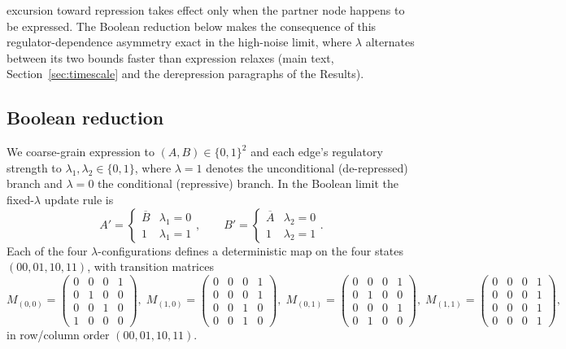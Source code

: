 \documentclass[11pt]{article}
\providecommand{\DIFaddtex}[1]{{\protect\color{red}#1}} %
\providecommand{\DIFdeltex}[1]{} %
\providecommand{\DIFaddbegin}{} %
\providecommand{\DIFaddend}{} %
\providecommand{\DIFdelbegin}{} %
\providecommand{\DIFdelend}{} %
\providecommand{\DIFadd}[1]{\texorpdfstring{\DIFaddtex{#1}}{#1}} %
\providecommand{\DIFdel}[1]{\texorpdfstring{\DIFdeltex{#1}}{}} %
\providecommand{\DIFaddincludegraphics}[2][]{\DIFOincludegraphics[#1]{#2}} %
\providecommand{\DIFdelincludegraphics}[2][]{}
\DeclareRobustCommand{\DIFaddbegin}{\DIFOaddbegin \let\includegraphics\DIFaddincludegraphics} %
\DeclareRobustCommand{\DIFaddend}{\DIFOaddend \let\includegraphics\DIFOincludegraphics} %
\DeclareRobustCommand{\DIFdelbegin}{\DIFOdelbegin \let\includegraphics\DIFdelincludegraphics} %
\DeclareRobustCommand{\DIFdelend}{\DIFOaddend \let\includegraphics\DIFOincludegraphics} %
\begin{document}
excursion toward repression \DIFdelbegin \DIFdel{fires }\DIFdelend \DIFaddbegin \DIFadd{takes effect }\DIFaddend only when the partner node happens to be
expressed. \DIFdelbegin \DIFdel{This unconditional-up / conditional-down asymmetry is the microscopic
origin of the enhancement derived below}\DIFdelend \DIFaddbegin \DIFadd{The Boolean reduction below makes the consequence of this
regulator-dependence asymmetry exact in the high-noise limit, where $\lambda$
alternates between its two bounds faster than expression relaxes (main text,
Section~\ref{sec:timescale} and the derepression paragraphs of the Results)}\DIFaddend .

\subsection{Boolean reduction}

We coarse-grain expression to $(A,B)\in\{0,1\}^2$ and each edge's regulatory
strength to $\lambda_{1},\lambda_{2}\in\{0,1\}$, where $\lambda=1$ denotes the
unconditional (de-repressed) branch and $\lambda=0$ the conditional (repressive)
branch. In the Boolean limit the fixed-$\lambda$ update rule is
\begin{equation}
  A' = \begin{cases}\overline{B} & \lambda_{1}=0\\[2pt] 1 & \lambda_{1}=1\end{cases},
  \qquad
  B' = \begin{cases}\overline{A} & \lambda_{2}=0\\[2pt] 1 & \lambda_{2}=1\end{cases}.
  \label{eq:boolupdate}
\end{equation}
Each of the four $\lambda$-configurations defines a deterministic map on the four
states $(00,01,10,11)$, with transition matrices
\begin{equation}
  M_{(0,0)}=\!\begin{pmatrix}0&0&0&1\\0&1&0&0\\0&0&1&0\\1&0&0&0\end{pmatrix}\!,\;
  M_{(1,0)}=\!\begin{pmatrix}0&0&0&1\\0&0&0&1\\0&0&1&0\\0&0&1&0\end{pmatrix}\!,\;
  M_{(0,1)}=\!\begin{pmatrix}0&0&0&1\\0&1&0&0\\0&0&0&1\\0&1&0&0\end{pmatrix}\!,\;
  M_{(1,1)}=\!\begin{pmatrix}0&0&0&1\\0&0&0&1\\0&0&0&1\\0&0&0&1\end{pmatrix}\!,
  \label{eq:configmaps}
\end{equation}
in row/column order $(00,01,10,11)$.
\end{document}
